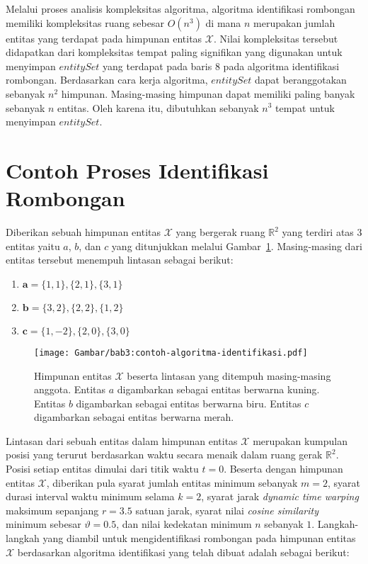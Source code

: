 Melalui proses analisis kompleksitas algoritma, algoritma identifikasi rombongan memiliki kompleksitas ruang sebesar $O(n^3)$ di mana $n$ merupakan jumlah entitas yang terdapat pada himpunan entitas $\mathcal{X}$. Nilai kompleksitas tersebut didapatkan dari kompleksitas tempat paling signifikan yang digunakan untuk menyimpan $entitySet$ yang terdapat pada baris $8$ pada algoritma identifikasi rombongan. Berdasarkan cara kerja algoritma, $entitySet$ dapat beranggotakan sebanyak $n^2$ himpunan. Masing-masing himpunan dapat memiliki paling banyak sebanyak $n$ entitas. Oleh karena itu, dibutuhkan sebanyak $n^3$ tempat untuk menyimpan $entitySet$.


\section{Contoh Proses Identifikasi Rombongan}
\label{sec:algorithm-example}

Diberikan sebuah himpunan entitas $\mathcal{X}$ yang bergerak ruang $\mathbb{R}^2$ yang terdiri atas 3 entitas yaitu $a$, $b$, dan $c$ yang ditunjukkan melalui Gambar~\ref{bab3:contoh-algoritma-identifikasi}. Masing-masing dari entitas tersebut menempuh lintasan sebagai berikut:

\begin{enumerate}
    \item $\textbf{a} = \{ 1, 1 \}, \{ 2, 1 \}, \{ 3, 1 \}$
    \item $\textbf{b} = \{ 3, 2 \}, \{ 2, 2 \}, \{ 1, 2 \}$
    \item $\textbf{c} = \{ 1, -2 \}, \{ 2, 0 \}, \{ 3, 0 \}$
\end{enumerate}

\begin{figure}[t]
    \centering
    \captionsetup{width=0.7\textwidth}
    \texttt{[image: Gambar/bab3:contoh-algoritma-identifikasi.pdf]}
    \caption[Contoh proses algoritma identifikasi rombongan]{Himpunan entitas $\mathcal{X}$ beserta lintasan yang ditempuh masing-masing anggota. Entitas $a$ digambarkan sebagai entitas berwarna kuning. Entitas $b$ digambarkan sebagai entitas berwarna biru. Entitas $c$ digambarkan sebagai entitas berwarna merah.}
    \label{bab3:contoh-algoritma-identifikasi}
\end{figure}

Lintasan dari sebuah entitas dalam himpunan entitas $\mathcal{X}$ merupakan kumpulan posisi yang terurut berdasarkan waktu secara menaik dalam ruang gerak $\mathbb{R}^2$. Posisi setiap entitas dimulai dari titik waktu $t = 0$. Beserta dengan himpunan entitas $\mathcal{X}$, diberikan pula syarat jumlah entitas minimum sebanyak $m = 2$, syarat durasi interval waktu minimum selama $k = 2$, syarat jarak \textit{dynamic time warping} maksimum sepanjang $r = 3.5$ satuan jarak, syarat nilai \textit{cosine similarity} minimum sebesar $\vartheta = 0.5$, dan nilai kedekatan minimum $n$ sebanyak $1$. Langkah-langkah yang diambil untuk mengidentifikasi rombongan pada himpunan entitas $\mathcal{X}$ berdasarkan algoritma identifikasi yang telah dibuat adalah sebagai berikut:

